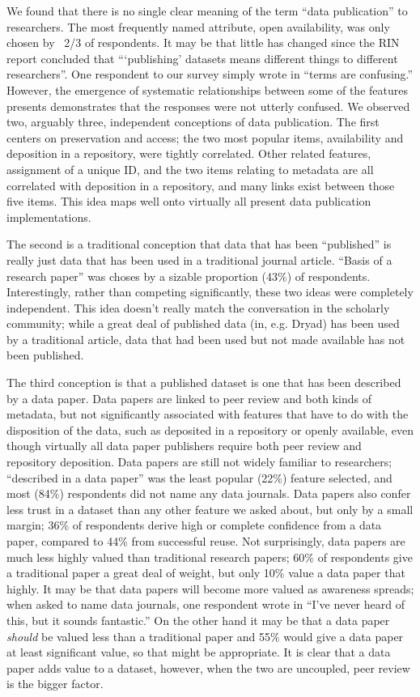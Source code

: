 \documentclass[10pt]{article}
\begin{document}
We found that there  is no single clear meaning of the term ``data publication'' to researchers.
The most frequently named attribute, open availability, was only chosen by ~2/3 of respondents.
It may be that little has changed since the RIN report concluded that ```publishing' datasets means different things to different researchers''\cite{swan_share_2008}.
One respondent to our survey simply wrote in ``terms are confusing.''
However, the emergence of systematic relationships between some of the features presents demonstrates that the responses were not utterly confused.
We observed two, arguably three, independent conceptions of data publication.
The first centers on preservation and access; the two most popular items, availability and deposition in a repository, were tightly correlated.
Other related features, assignment of a unique ID, and the two items relating to metadata are all correlated with deposition in a repository, and many links exist between those five items.
This idea maps well onto virtually all present data publication implementations.

The second is a traditional conception that data that has been ``published'' is really just data that has been used in a traditional journal article. 
``Basis of a research paper'' was choses by a sizable proportion (43\%) of respondents.
Interestingly, rather than competing significantly, these two ideas were completely independent.
This idea doesn't really match the conversation in the scholarly community; while a great deal of published data (in, e.g. Dryad) has been used by a traditional article, data that had been used but not made available has not been published.

The third conception is that a published dataset is one that has been described by a data paper.
Data papers are linked to peer review and both kinds of metadata, but not significantly associated with features that have to do with the disposition of the data, such as deposited in a repository or openly available, even though virtually all data paper publishers require both peer review and repository deposition.
Data papers are still not widely familiar to researchers; ``described in a data paper'' was the least popular (22\%) feature selected, and most (84\%) respondents did not name any data journals.
Data papers also confer less trust in a dataset than any other feature we asked about, but only by a small margin; 36\% of respondents derive high or complete confidence from a data paper, compared to 44\% from successful reuse.
Not surprisingly, data papers are much less highly valued than traditional research papers; 60\% of respondents give a traditional paper a great deal of weight, but only 10\% value a data paper that highly.
It may be that data papers will become more valued as awareness spreads; when asked to name data journals, one respondent wrote in ``I've never heard of this, but it sounds fantastic.''
On the other hand it may be that a data paper \emph{should} be valued less than a traditional paper and 55\% would give a data paper at least significant value, so that might be appropriate.
It is clear that a data paper adds value to a dataset, however, when the two are uncoupled, peer review is the bigger factor.
 
\end{document}
